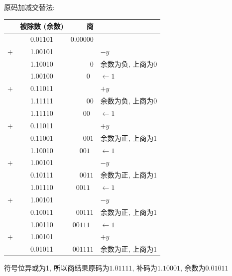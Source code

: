 \documentclass[UTF8]{report}
\newcommand{\la}{\leftarrow}
\newcommand{\spz}{\phantom{0}}
\newenvironment{solution}{{\noindent\hskip 2em \bf 解 \quad}}{}
\begin{document}
\begin{solution}
\begin{enumerate}
        原码加减交替法:
        \begin{tabular}{cc|r|l}
            & 被除数 (余数)   & 商    & \\
        \hline
            & 0.01101  &  $0.00000 $ &   \\
        +& 1.00101  &         $ $ &  $-y$ \\
        \hline
            & 1.10010  &        $0 $ & 余数为负, 上商为$0$ \\
            & 1.00100  &     $0\spz$ & $\la 1$ \\
        +& 0.11011  &         $ $ &  $+y$ \\
        \hline
            & 1.11111  &       $00 $ & 余数为负, 上商为$0$ \\
            & 1.11110  &    $00\spz$ & $\la 1$ \\
        +& 0.11011  &         $ $ & $+y$ \\
        \hline
            & 0.11001  &      $001 $ & 余数为正, 上商为$1$ \\
            & 1.10010  &   $001\spz$ & $\la 1$ \\
        +& 1.00101  &         $ $ &  $-y$ \\
        \hline
            & 0.10111  &     $0011 $ & 余数为正, 上商为$1$ \\
            & 1.01110  &  $0011\spz$ & $\la 1$ \\
        +& 1.00101  &         $ $ &  $-y$ \\
        \hline
            & 0.10011  &    $00111 $ & 余数为正, 上商为$1$ \\
            & 1.00110  & $00111\spz$ & $\la 1$ \\
        +& 1.00101  &         $ $ &  $+y$ \\
        \hline
            & 0.01011  &   $001111 $ & 余数为正, 上商为$1$ \\
        \end{tabular}

        符号位异或为1, 所以商结果原码为$1.01111$, 补码为$1.10001$, 余数为$0.01011$


\end{enumerate}
\end{solution}
\end{document}
